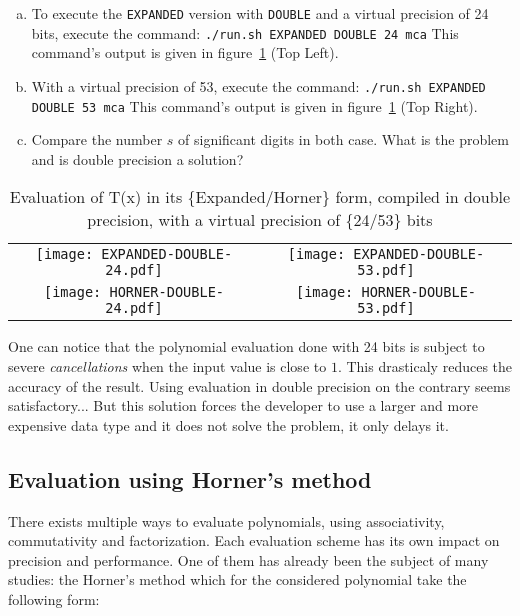 \begin{question}
\begin{enumerate}[(a)]
\item To execute the {\tt EXPANDED} version with {\tt DOUBLE} and a virtual precision of 24 bits, execute the command: {\tt ./run.sh EXPANDED
      DOUBLE 24 mca} \newline This command's output is given in figure~\ref{fig:exp_hor_24_53} (Top Left).
  \item With a virtual precision of 53, execute the command: {\tt ./run.sh EXPANDED DOUBLE 53 mca} \newline
  This command's output is given in figure~\ref{fig:exp_hor_24_53} (Top Right).
  \item Compare the number $s$ of significant digits in both case. What is the problem and is double precision a solution?
  \end{enumerate}
\end{question}

\begin{table}
\begin{tabular}{cc}
\texttt{[image: EXPANDED-DOUBLE-24.pdf]} &
\texttt{[image: EXPANDED-DOUBLE-53.pdf]} \\
\texttt{[image: HORNER-DOUBLE-24.pdf]} &
\texttt{[image: HORNER-DOUBLE-53.pdf]} \\
\end{tabular}
  \caption{Evaluation of T(x) in its \{Expanded/Horner\} form, compiled in double precision, with a virtual precision of \{24/53\} bits}
  \label{fig:exp_hor_24_53}
\end{table}


One can notice that the polynomial evaluation done with 24 bits is subject to severe {\it cancellations} when the input value is close to $1$.
This drasticaly reduces the accuracy of the result.
Using evaluation in double precision on the contrary seems satisfactory...
But this solution forces the developer to use a larger and more expensive data type and it does not solve the problem, it only delays it.

\FloatBarrier

\subsection{Evaluation using Horner's method}
There exists multiple ways to evaluate polynomials, using associativity, commutativity and factorization.
Each evaluation scheme has its own impact on precision and performance.
One of them has already been the subject of many studies: the Horner's method which for the considered polynomial take the following form:


